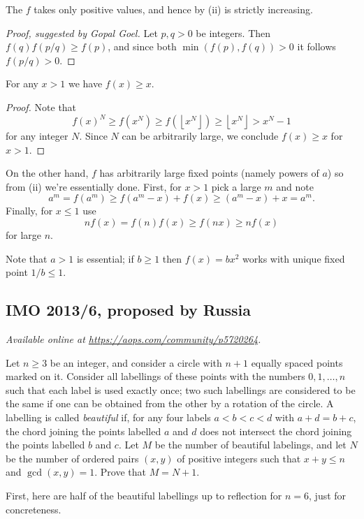 \documentclass[11pt]{scrartcl}
\begin{document}
\begin{claim*}
  The $f$ takes only positive values,
  and hence by (ii) is strictly increasing.
\end{claim*}
\begin{proof}[Proof, suggested by Gopal Goel]
  Let $p,q > 0$ be integers.
  Then $f(q) f(p/q) \ge f(p)$,
  and since both $\min(f(p), f(q)) > 0$
  it follows $f(p/q) > 0$.
\end{proof}

\begin{claim*}
  For any $x > 1$ we have $f(x) \ge x$.
\end{claim*}
\begin{proof}
  Note that
  \[ f(x)^N \ge f(x^N) \ge f\left( \left\lfloor x^N \right\rfloor \right)
    \ge \left\lfloor x^N \right\rfloor > x^N-1 \]
  for any integer $N$.
  Since $N$ can be arbitrarily large,
  we conclude $f(x) \ge x$ for $x > 1$.
\end{proof}

On the other hand, $f$ has arbitrarily large fixed points
(namely powers of $a$) so from (ii) we're essentially done.
First, for $x > 1$ pick a large $m$ and note
\[ a^m = f(a^m) \ge f(a^m-x) + f(x) \ge (a^m-x)+x = a^m. \]
Finally, for $x \le 1$ use
\[ nf(x) = f(n)f(x) \ge f(nx) \ge nf(x) \]
for large $n$.

\begin{remark*}
Note that $a > 1$ is essential;
if $b \ge 1$ then $f(x) = bx^2$ works with unique fixed point $1/b \le 1$.
\end{remark*}
\pagebreak

\subsection{IMO 2013/6, proposed by Russia}
\textsl{Available online at \url{https://aops.com/community/p5720264}.}
\begin{mdframed}[style=mdpurplebox,frametitle={Problem statement}]
Let $n \ge 3$ be an integer,
and consider a circle with $n + 1$ equally spaced points marked on it.
Consider all labellings of these points with the numbers
$0, 1, \dots , n$ such that each label is used exactly once;
two such labellings are considered to be the same if
one can be obtained from the other by a rotation of the circle.
A labelling is called \emph{beautiful} if,
for any four labels $a < b < c < d$ with $a + d = b + c$,
the chord joining the points labelled $a$ and $d$
does not intersect the chord joining the points labelled $b$ and $c$.
Let $M$ be the number of beautiful labelings,
and let $N$ be the number of ordered pairs $(x, y)$ of positive integers
such that $x + y \le n$ and $\gcd(x, y) = 1$.
Prove that $M = N + 1$.
\end{mdframed}
First, here are half of the beautiful labellings up to reflection for $n = 6$,
just for concreteness.
\end{document}
